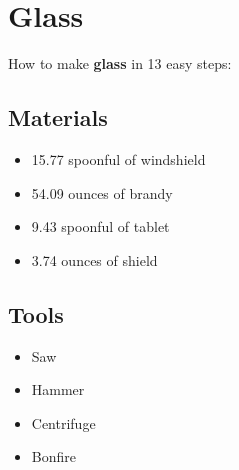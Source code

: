 \documentclass{article}
\begin{document}
\section{Glass}How to make \textbf{glass} in 13 easy steps:

\subsection{Materials}\begin{itemize}
\item 
15.77 spoonful of windshield
\item 
54.09 ounces of brandy
\item 
9.43 spoonful of tablet
\item 
3.74 ounces of shield
\end{itemize}
\subsection{Tools}\begin{itemize}
\item 
Saw
\item 
Hammer
\item 
Centrifuge
\item 
Bonfire
\end{itemize}
\end{document}
